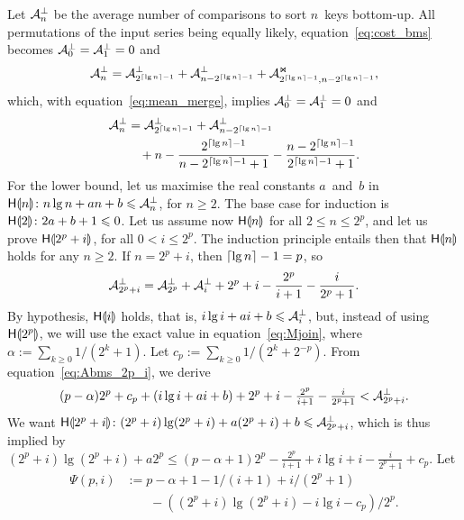 Let \(\mathcal{A}_{n}^{\bot}\) be the average number of comparisons to sort
\(n\)~keys bottom-up. All permutations of the input series being
equally likely, equation~\eqref{eq:cost_bms} becomes \(\mathcal{A}_{0}^{\bot} =
\mathcal{A}_{1}^{\bot} = 0\) and
\begin{equation*}
\mathcal{A}_{n}^{\bot} = \mathcal{A}_{2^{\lceil{\lg n}\rceil-1}}^{\bot}
+ \mathcal{A}_{n - 2^{\lceil{\lg n}\rceil-1}}^{\bot}
+ \mathcal{A}_{2^{\lceil{\lg n}\rceil-1},n - 2^{\lceil{\lg n}\rceil-1}}^{\Join},
\end{equation*}
which, with equation~\eqref{eq:mean_merge}, implies \(\mathcal{A}_{0}^{\bot} =
\mathcal{A}_{1}^{\bot} = 0\) and
\begin{align*}
\mathcal{A}_{n}^{\bot} &= \mathcal{A}_{2^{\lceil{\lg n}\rceil-1}}^{\bot}
+ \mathcal{A}_{n - 2^{\lceil{\lg n}\rceil-1}}^{\bot}\\
&\phantom{=} \,
+ n - \frac{2^{\lceil{\lg n}\rceil-1}}{n - 2^{\lceil{\lg n}\rceil-1} + 1}
- \frac{n - 2^{\lceil{\lg n}\rceil-1}}{2^{\lceil{\lg n}\rceil-1}+1}.
\end{align*}
For the lower bound, let us maximise the real constants
\(a\)~and~\(b\) in \(\textsf{H}\llparenthesis{n}\rrparenthesis \colon n\lg n + an + b \leqslant
\mathcal{A}_{n}^{\bot}\), for \(n \geqslant 2\). The base case for induction is
\(\textsf{H}\llparenthesis{2}\rrparenthesis \colon 2a + b + 1 \leqslant 0\). Let us assume now
\(\textsf{H}\llparenthesis{n}\rrparenthesis\) for all \(2 \leqslant n \leqslant 2^p\), and let us
prove \(\textsf{H}\llparenthesis{2^p+i}\rrparenthesis\), for all \(0 < i \leqslant 2^p\). The
induction principle entails then that \(\textsf{H}\llparenthesis{n}\rrparenthesis\) holds for any
\(n \geqslant 2\). If \(n=2^p+i\), then \(\lceil{\lg n}\rceil - 1 = p\),
so
\begin{equation}
\mathcal{A}_{2^p+i}^{\bot} = \mathcal{A}_{2^p}^{\bot} + \mathcal{A}_{i}^{\bot}
+ 2^p + i - \frac{2^p}{i+1} - \frac{i}{2^p+1}.
\label{eq:Abms_2p_i}
\end{equation}
By hypothesis, \(\textsf{H}\llparenthesis{i}\rrparenthesis\) holds, that is, \(i\lg i + ai + b
\leqslant \mathcal{A}_{i}^{\bot}\), but, instead of using
\(\textsf{H}\llparenthesis{2^p}\rrparenthesis\), we will use the exact value in
equation~\eqref{eq:Mjoin}, where \(\alpha :=
\sum_{k \geqslant 0}1/(2^k+1)\). Let \(c_p := \sum_{k \geqslant 0}1/(2^{k}+2^{-p})\). From equation~\eqref{eq:Abms_2p_i},
we derive
\begin{equation*}
(p-\alpha)2^p + c_p + (i\lg i + ai + b) + 2^p + i -
\tfrac{2^p}{i+1} - \tfrac{i}{2^p+1} < \mathcal{A}_{2^p+i}^{\bot}.
\end{equation*}
We want \(\textsf{H}\llparenthesis{2^p+i}\rrparenthesis \colon (2^p+i)\lg(2^p+i) + a(2^p+i) + b
\leqslant \mathcal{A}_{2^p+i}^{\bot}\), which is thus implied by
\((2^p+i)\lg(2^p+i) + a2^p \leqslant (p - \alpha + 1)2^p -
\tfrac{2^p}{i+1} + i\lg i + i - \tfrac{i}{2^p+1} + c_p\). Let
\begin{align*}
  \Psi(p,i) &:= p - \alpha + 1 - 1/(i+1) + i/(2^p+1)\\
&\phantom{:=} \; - ((2^p+i)\lg(2^p+i) - i\lg i - c_p)/2^p.
\end{align*}
